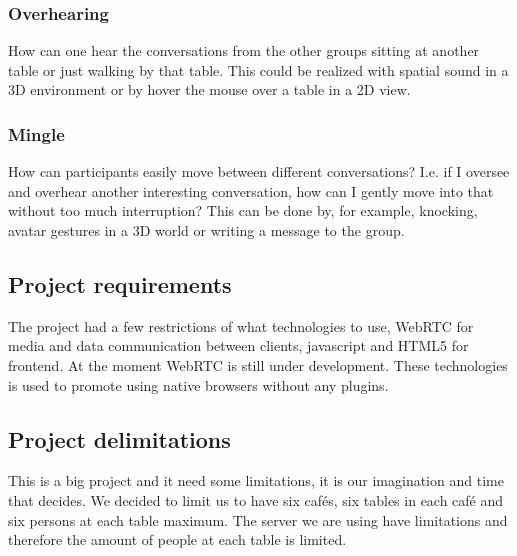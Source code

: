 \documentclass[12pt, titlepage]{article}
\begin{document}
\subsubsection{Overhearing}
How can one hear the conversations from the other groups sitting at another table or just walking by that table. This could be realized with spatial sound in a 3D environment or by hover the mouse over a table in a 2D view.
\subsubsection{Mingle}
How can participants easily move between different conversations? I.e. if I oversee and overhear another interesting conversation, how can I gently move into that without too much interruption? This can be done by, for example, knocking, avatar gestures in a 3D world or writing a message to the group.

\subsection{Project requirements}
The project had a few restrictions of what technologies to use, WebRTC for media and data communication between clients, javascript and HTML5 for frontend. At the moment WebRTC is still under development. These technologies is used to promote using native browsers without any plugins.
\subsection{Project delimitations}
This is a big project and it need some limitations, it is our imagination and time that decides. We decided to limit us to have six cafés, six tables in each café and six persons at each table maximum. The server we are using have limitations and therefore the amount of people at each table is limited.
\end{document}
